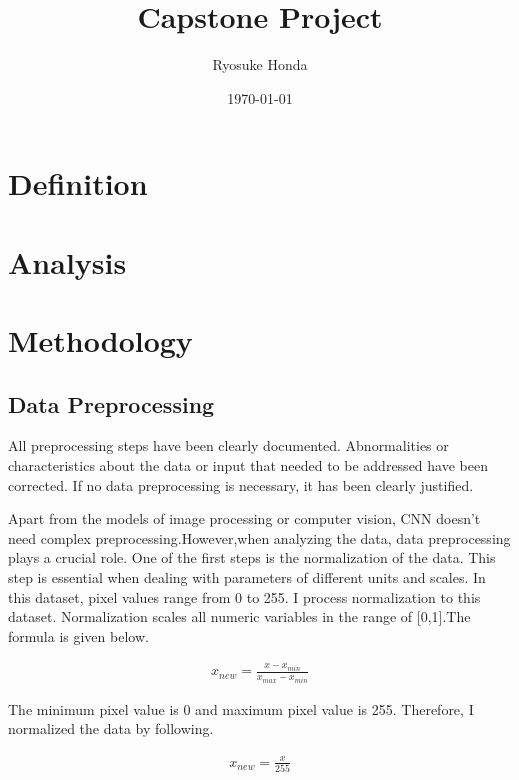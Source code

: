 \documentclass[a4paper,10pt,fleqn]{article}
\title{{\Huge Capstone Project}}%
\author{Ryosuke Honda}
\date{\today}
\begin{document}
\maketitle

\section{Definition}






\section{Analysis}







\section{Methodology}
\subsection{Data Preprocessing}
All preprocessing steps have been clearly documented. Abnormalities or characteristics about the data or input that needed to be addressed have been corrected. If no data preprocessing is necessary, it has been clearly justified.

Apart from the models of image processing or computer vision, CNN doesn't need complex preprocessing.However,when analyzing the data, data preprocessing plays a crucial role. One of the first steps is the normalization of the data. This step is essential when dealing with parameters of different units and scales. In this dataset, pixel values range from 0 to 255. I process normalization to this dataset.
Normalization scales all numeric variables in the range of [0,1].The formula is given below.

\begin{eqnarray}
x_{new}=\frac{x-x_{min}}{x_{max}-x_{min}}
\end{eqnarray}

The minimum pixel value is 0 and maximum pixel value is 255. Therefore, I normalized the data by following.



\begin{eqnarray}
x_{new}=\frac{x}{255}
\end{eqnarray}
\end{document}
